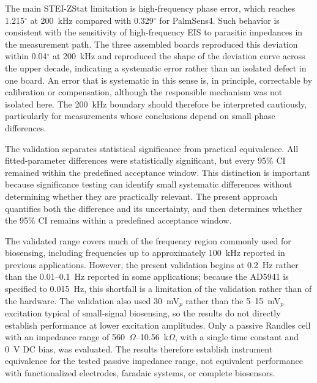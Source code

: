 The main STEI-ZStat limitation is high-frequency phase error, which reaches 1.215$^\circ$ at 200~kHz compared with 0.329$^\circ$ for PalmSens4. Such behavior is consistent with the sensitivity of high-frequency EIS to parasitic impedances in the measurement path. The three assembled boards reproduced this deviation within 0.04$^\circ$ at 200~kHz and reproduced the shape of the deviation curve across the upper decade, indicating a systematic error rather than an isolated defect in one board. An error that is systematic in this sense is, in principle, correctable by calibration or compensation, although the responsible mechanism was not isolated here. The 200~kHz boundary should therefore be interpreted cautiously, particularly for measurements whose conclusions depend on small phase differences.

The validation separates statistical significance from practical equivalence. All fitted-parameter differences were statistically significant, but every 95\% CI remained within the predefined acceptance window. This distinction is important because significance testing can identify small systematic differences without determining whether they are practically relevant. The present approach quantifies both the difference and its uncertainty, and then determines whether the 95\% CI remains within a predefined acceptance window.

The validated range covers much of the frequency region commonly used for biosensing, including frequencies up to approximately 100~kHz reported in previous applications. However, the present validation begins at 0.2~Hz rather than the 0.01--0.1~Hz reported in some applications; because the AD5941 is specified to 0.015~Hz, this shortfall is a limitation of the validation rather than of the hardware. The validation also used 30~mV$_p$ rather than the 5--15~mV$_p$ excitation typical of small-signal biosensing, so the results do not directly establish performance at lower excitation amplitudes. Only a passive Randles cell with an impedance range of 560~$\Omega$--10.56~k$\Omega$, with a single time constant and 0~V DC bias, was evaluated. The results therefore establish instrument equivalence for the tested passive impedance range, not equivalent performance with functionalized electrodes, faradaic systems, or complete biosensors.

